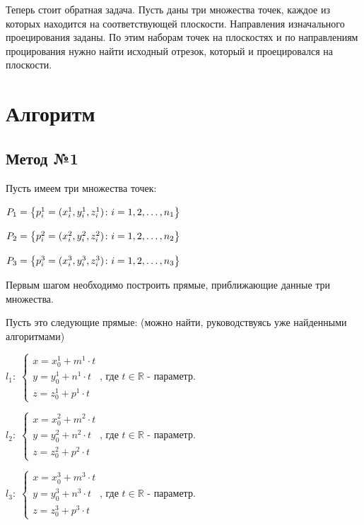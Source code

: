 \documentclass[article,final,14pt]{scrreprt}
\begin{document}
Теперь стоит обратная задача. Пусть даны три множества точек, каждое из которых находится на соответствующей плоскости. Направления изначального проецирования заданы. По этим наборам точек на плоскостях и по направлениям процирования нужно найти исходный отрезок, который и проецировался на плоскости.

\newpage
\chapter{Алгоритм}

\section{Метод №1}\label{meth1}

Пусть имеем три множества точек: 

\begin{center}
	$P_1 = \left\{p_i^1 = (x_i^1, y_i^1, z_i^1)\colon i=1,2,\dots,n_1\right\}$

	\vspace{0.3cm}
	$P_2 = \left\{p_i^2 = (x_i^2, y_i^2, z_i^2)\colon i=1,2,\dots,n_2\right\}$

	\vspace{0.3cm}
	$P_3 = \left\{p_i^3 = (x_i^3, y_i^3, z_i^3)\colon i=1,2,\dots,n_3\right\}$
\end{center}

Первым шагом необходимо построить прямые, приближающие данные три множества.

Пусть это следующие прямые: (можно найти, руководствуясь уже найденными алгоритмами)

\begin{center}
	$\mathit{l_1}: \; \begin{cases}
		x = x_0^1 + m^1 \cdot t \\
		y = y_0^1 + n^1 \cdot t \\
		z = z_0^1 + p^1 \cdot t
	\end{cases}$, где $t \in \mathbb{R}$ - параметр. 
\end{center}

\begin{center}
	$\mathit{l_2}: \; \begin{cases}
		x = x_0^2 + m^2 \cdot t \\
		y = y_0^2 + n^2 \cdot t \\
		z = z_0^2 + p^2 \cdot t
	\end{cases}$, где $t \in \mathbb{R}$ - параметр. 
\end{center}

\begin{center}
	$\mathit{l_3}: \; \begin{cases}
		x = x_0^3 + m^3 \cdot t \\
		y = y_0^3 + n^3 \cdot t \\
		z = z_0^3 + p^3 \cdot t
	\end{cases}$, где $t \in \mathbb{R}$ - параметр. 
\end{center}
\end{document}
